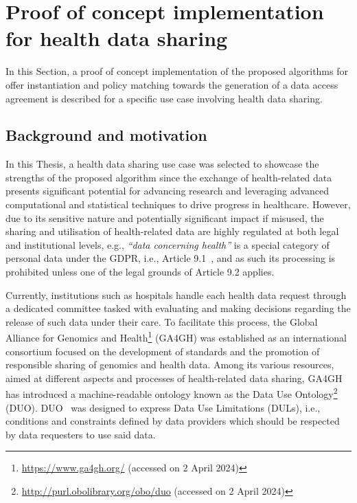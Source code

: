 \section{Proof of concept implementation for health data sharing}
\label{sec:poc_health}

In this Section, a proof of concept implementation of the proposed algorithms for offer instantiation and policy matching towards the generation of a data access agreement is described for a specific use case involving health data sharing.

\subsection{Background and motivation}
\label{sec:poc_background}

In this Thesis, a health data sharing use case was selected to showcase the strengths of the proposed algorithm since the exchange of health-related data presents significant potential for advancing research and leveraging advanced computational and statistical techniques to drive progress in healthcare.
However, due to its sensitive nature and potentially significant impact if misused, the sharing and utilisation of health-related data are highly regulated at both legal and institutional levels, e.g., \textit{``data concerning health''} is a special category of personal data under the GDPR, i.e., Article 9.1~\citeyearpar{noauthor_regulation_2016}, and as such its processing is prohibited unless one of the legal grounds of Article 9.2 applies.

Currently, institutions such as hospitals handle each health data request through a dedicated committee tasked with evaluating and making decisions regarding the release of such data under their care.
To facilitate this process, the Global Alliance for Genomics and Health\footnote{\url{https://www.ga4gh.org/} (accessed on 2 April 2024)} (GA4GH) was established as an international consortium focused on the development of standards and the promotion of responsible sharing of genomics and health data.
Among its various resources, aimed at different aspects and processes of health-related data sharing, GA4GH has introduced a machine-readable ontology known as the Data Use Ontology\footnote{\url{http://purl.obolibrary.org/obo/duo} (accessed on 2 April 2024)} (DUO).
DUO~\citep{lawson_data_2021,rehm_ga4gh_2021} was designed to express Data Use Limitations (DULs), i.e., conditions and constraints defined by data providers which should be respected by data requesters to use said data.

